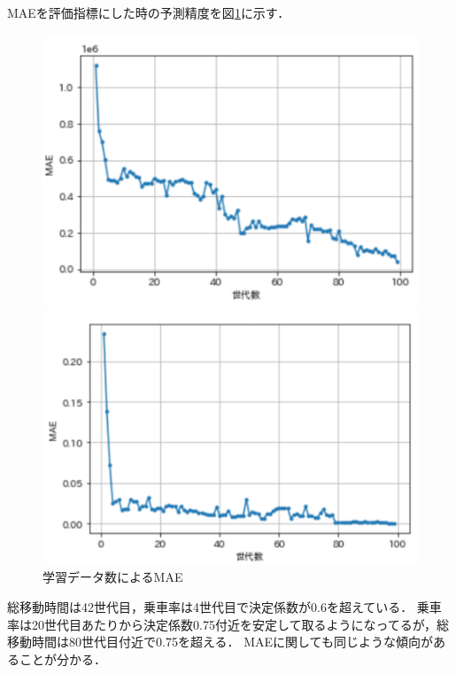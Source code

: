 \documentclass[main]{subfiles}
\begin{document}
    MAEを評価指標にした時の予測精度を図\ref{data_2}に示す．
    \begin{figure}
        \begin{minipage}[b]{0.45\linewidth}
          \centering
          \includegraphics[width=\linewidth]{figures/z_r.png}
        \end{minipage}
        \begin{minipage}[b]{0.45\linewidth}
          \centering
          \includegraphics[width=\linewidth]{figures/z_mae.png}
        \end{minipage}
        \caption{学習データ数によるMAE}
        \label{data_2}
    \end{figure}

    総移動時間は42世代目，乗車率は4世代目で決定係数が0.6を超えている．
    乗車率は20世代目あたりから決定係数0.75付近を安定して取るようになってるが，総移動時間は80世代目付近で0.75を超える．
    MAEに関しても同じような傾向があることが分かる．
\end{document}
